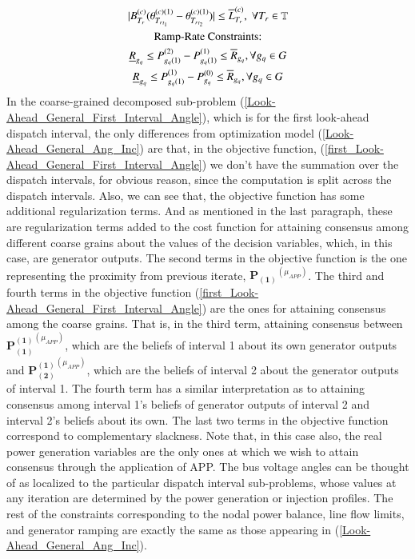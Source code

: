 \documentclass[preprint,12pt,3p]{elsarticle}
\begin{document}
\begin{subequations}
\begin{gather}
		|B_{T_r}^{(c)}(\theta_{{T_r}_{t_1}}^{(c)(1)}-\theta_{{T_r}_{t_2}}^{(c)(1)})|\leq{{\overline{L}}_{T_r}^{(c)}},\;\forall{T_r\in{\mathbb{T}}}\label{third1_Look-Ahead_General_First_Interval_Angle}\\
		\text{Ramp-Rate Constraints:}\notag\\
		\underline{R}_{g_q}\leq P_{{g_q}(1)}^{(2)}-P_{{g_q}(1)}^{(1)}\leq \overline{R}_{g_q},\forall {g_q}\in G\label{fourth_Look-Ahead_General_First_Interval_Angle}\\
		\underline{R}_{g_q}\leq P_{{g_q}(1)}^{(1)}-P_{g_q}^{(0)}\leq \overline{R}_{g_q},\forall {g_q}\in G\label{fifth_Look-Ahead_General_First_Interval_Angle}
		\end{gather}
	\end{subequations}
	In the coarse-grained decomposed sub-problem (\ref{Look-Ahead_General_First_Interval_Angle}), which is for the first look-ahead dispatch interval, the only differences from optimization model (\ref{Look-Ahead_General_Ang_Inc}) are that, in the objective function, (\ref{first_Look-Ahead_General_First_Interval_Angle}) we don't have the summation over the dispatch intervals, for obvious reason, since the computation is split across the dispatch intervals. Also, we can see that, the objective function has some additional regularization terms. And as mentioned in the last paragraph, these are regularization terms added to the cost function for attaining consensus among different coarse grains about the values of the decision variables, which, in this case, are generator outputs. The second terms in the objective function is the one representing the proximity from previous iterate, $\mathbf{P_{(1)}}^{(\mu_{APP})}$. The third and fourth terms in the objective function (\ref{first_Look-Ahead_General_First_Interval_Angle}) are the ones for attaining consensus among the coarse grains. That is, in the third term, attaining consensus between $\mathbf{P_{(1)}^{(1)}}^{(\mu_{APP})}$, which are the beliefs of interval 1 about its own generator outputs and $\mathbf{P_{(2)}^{(1)}}^{(\mu_{APP})}$, which are the beliefs of interval 2 about the generator outputs of interval 1.  The fourth term has a similar interpretation as to attaining consensus among interval 1's beliefs of generator outputs of interval 2 and interval 2's beliefs about its own. The last two terms in the objective function correspond to complementary slackness. Note that, in this case also, the real power generation variables are the only ones at which we wish to attain consensus through the application of APP. The bus voltage angles can be thought of as localized to the particular dispatch interval sub-problems, whose values at any iteration are determined by the power generation or injection profiles. The rest of the constraints corresponding to the nodal power balance, line flow limits, and generator ramping are exactly the same as those appearing in (\ref{Look-Ahead_General_Ang_Inc}).\\
\end{document}
